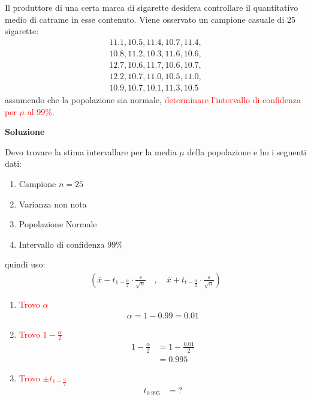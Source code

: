 \documentclass{article}  %
\theoremstyle{definition}
\begin{document}
\begin{esercizio}[Esercizio 2]
	Il produttore di una certa marca di sigarette desidera controllare il quantitativo medio di catrame in esse contenuto.
	Viene osservato un  campione casuale di 25 sigarette:
	\begin{align*}
		11.1, 10.5, 11.4, 10.7, 11.4, \\
		10.8, 11.2, 10.3, 11.6, 10.6, \\
		12.7, 10.6, 11.7, 10.6, 10.7, \\
		12.2, 10.7, 11.0, 10.5, 11.0, \\
		10.9, 10.7, 10.1, 11.3, 10.5
	\end{align*}
	assumendo che la popolazione sia normale, \textcolor{red}
	{determinare l'intervallo di confidenza per $\mu$ al 99$\%$.}
	\begin{center}
		\textbf{Soluzione}
	\end{center}
	Devo trovare la stima intervallare per la media $\mu$ della popolazione e ho i seguenti dati:
	\begin{enumerate}
		\item Campione $n=25$
		\item Varianza non nota
		\item Popolazione Normale
		\item Intervallo di confidenza $99\%$
	\end{enumerate}
	quindi uso:
	\begin{align*}
		\left(\overline{x}-t_{1-\frac{\alpha}{2}}\cdot \frac{s}{\sqrt{n}} \quad , \quad \overline{x}+t_{t-\frac{\alpha}{2}}\cdot \frac{s}{\sqrt{n}}\right)
	\end{align*}
	\begin{enumerate}
		\item \textcolor{red}{Trovo $\alpha$}
		      \begin{align*}
			      \alpha = 1 - 0.99 = 0.01
		      \end{align*}
		\item \textcolor{red}{Trovo $1-\frac{\alpha}{2}$}
		      \begin{align*}
			      1-\frac{\alpha}{2} & = 1 - \frac{0.01}{2} \\
			                         & = 0.995
		      \end{align*}
		\item \textcolor{red}{Trovo $\pm t_{1- \frac{\alpha}{2}}$}
		      \begin{align*}
			      t_{0.995} & = ?                                                                          \\

\end{align*}
\end{enumerate}
\end{esercizio}
\end{document}
